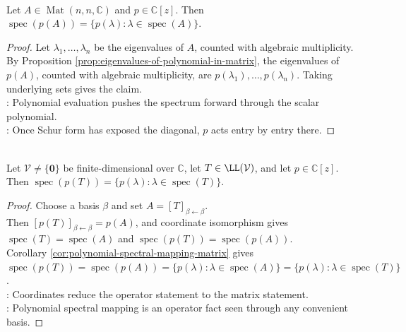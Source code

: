 \begin{corollary} \label{cor:polynomial-spectral-mapping-matrix} \\
Let $A\in\operatorname{Mat}(n,n,\mathbb{C})$ and $p\in\mathbb{C}[z]$. Then $\operatorname{spec}(p(A))=\{p(\lambda):\lambda\in\operatorname{spec}(A)\}$.
\begin{proof}
Let $\lambda_1,\ldots,\lambda_n$ be the eigenvalues of $A$, counted with algebraic multiplicity.\\
By Proposition \ref{prop:eigenvalues-of-polynomial-in-matrix}, the eigenvalues of $p(A)$, counted with algebraic multiplicity, are $p(\lambda_1),\ldots,p(\lambda_n)$. Taking underlying sets gives the claim.\\
: Polynomial evaluation pushes the spectrum forward through the scalar polynomial.\\
: Once Schur form has exposed the diagonal, $p$ acts entry by entry there.
\end{proof}
\end{corollary}

\begin{corollary} \label{cor:polynomial-spectral-mapping-operator} \\
Let $\mathcal{V}\neq\{\mathbf{0}\}$ be finite-dimensional over $\mathbb{C}$, let $T\in\LL(\mathcal{V})$, and let $p\in\mathbb{C}[z]$.\\
Then $\operatorname{spec}(p(T))=\{p(\lambda):\lambda\in\operatorname{spec}(T)\}$.
\begin{proof}
Choose a basis $\beta$ and set $A=[T]_{\beta\leftarrow\beta}$.\\
Then $[p(T)]_{\beta\leftarrow\beta}=p(A)$, and coordinate isomorphism gives $\operatorname{spec}(T)=\operatorname{spec}(A)$ and $\operatorname{spec}(p(T))=\operatorname{spec}(p(A))$.\\
Corollary \ref{cor:polynomial-spectral-mapping-matrix} gives $\operatorname{spec}(p(T))=\operatorname{spec}(p(A))=\{p(\lambda):\lambda\in\operatorname{spec}(A)\}=\{p(\lambda):\lambda\in\operatorname{spec}(T)\}$.\\
: Coordinates reduce the operator statement to the matrix statement.\\
: Polynomial spectral mapping is an operator fact seen through any convenient basis.
\end{proof}
\end{corollary}

